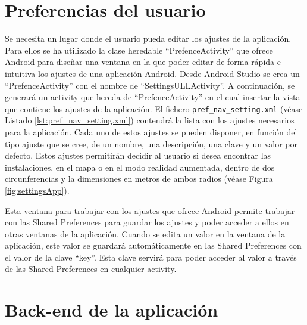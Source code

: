  

 
    
\section{Preferencias del usuario}

Se necesita un lugar donde el usuario pueda editar los ajustes de la aplicación. Para ellos se ha utilizado la clase heredable ``PrefenceActivity'' que ofrece Android para diseñar una ventana en la que poder editar de forma rápida e intuitiva los ajustes de una aplicación Android. Desde Android Studio se crea un ``PrefenceActivity'' con el nombre de ``SettingsULLActivity''. A continuación, se generará un activity que hereda de ``PrefenceActivity'' en el cual insertar la vista que contiene los ajustes de la aplicación. El fichero \texttt{pref\_nav\_setting.xml} (véase Listado \ref{lst:pref_nav_setting.xml}) contendrá la lista con los ajustes necesarios para la aplicación. Cada uno de estos ajustes se pueden disponer, en función del tipo ajuste que se cree, de un nombre, una descripción, una clave y un valor por defecto. Estos ajustes permitirán decidir al usuario si desea encontrar las instalaciones, en el mapa o en el modo realidad aumentada, dentro de dos circunferencias y la dimensiones en metros de ambos radios (véase Figura \ref{fig:settingsApp}).
 


Esta ventana para trabajar con los ajustes que ofrece Android permite trabajar con las Shared Preferences para guardar los ajustes y poder acceder a ellos en otras ventanas de la aplicación. Cuando se edita un valor en la ventana de la aplicación, este valor se guardará automáticamente en las Shared Preferences con el valor de la clave ``key''. Esta clave servirá para poder acceder al valor a través de las Shared Preferences en cualquier activity.

% 


\section{Back-end de la aplicación} \label{chap:BackEnd} 

